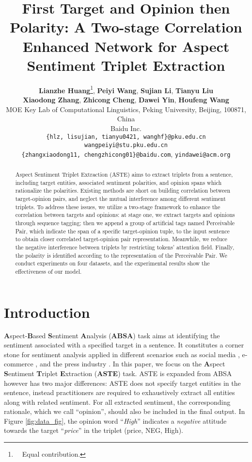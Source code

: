 \documentclass[11pt]{article}
\title{First Target and Opinion then Polarity: A Two-stage Correlation Enhanced Network for Aspect Sentiment Triplet Extraction}
\author{\textbf{Lianzhe Huang}\thanks{~~Equal contribution.}, \textbf{Peiyi Wang}, \textbf{Sujian Li}, \textbf{Tianyu Liu} \\ \textbf{Xiaodong Zhang}, \textbf{Zhicong Cheng}, \textbf{Dawei Yin}, \textbf{Houfeng Wang}\\ 
MOE Key Lab of Computational Linguistics, Peking University, Beijing, 100871, China \\
Baidu Inc.\\
\texttt{\{hlz, lisujian, tianyu0421, wanghf\}@pku.edu.cn} \\ \texttt{wangpeiyi@stu.pku.edu.cn} \\
\texttt{\{zhangxiaodong11, chengzhicong01\}@baidu.com},  
\texttt{yindawei@acm.org}
}
\begin{document}
\maketitle

\begin{abstract}
Aspect Sentiment Triplet Extraction (ASTE) aims to extract triplets from a sentence, including target entities, associated sentiment polarities, and opinion spans which rationalize the polarities.
Existing methods are short on building correlation between target-opinion pairs, and neglect the mutual interference among different sentiment triplets.
To address these issues, we utilize a two-stage framework to enhance the correlation between targets and opinions: at stage one, we extract targets and opinions through sequence tagging; then we append a group of artificial tags named Perceivable Pair, which indicate the span of a specific target-opinion tuple, to the input sentence to obtain closer correlated target-opinion pair representation. Meanwhile, we reduce the negative interference between triplets by restricting tokens' attention field. Finally, the polarity is identified according to the representation of the Perceivable Pair. 
We conduct experiments on four datasets, and the experimental results show the effectiveness of our model. 
\end{abstract} \section{Introduction}\label{chap: intro}

\textbf{A}spect-\textbf{B}ased \textbf{S}entiment \textbf{A}nalysis (\textbf{ABSA}) \cite{liu2012sentiment,ma2017interactive,zhao2019modeling} task aims at identifying the sentiment 
associated with a specified target in a sentence.
It constitutes a corner stone for sentiment analysis \cite{feldman2013techniques,zhang2018deep} applied in different scenarios such as social media \cite{agarwal2011sentiment}, e-commerce \cite{fang2015sentiment}, and the press industry \cite{godbole2007large}. 
In this paper, we focus on the \textbf{A}spect \textbf{S}entiment \textbf{T}riplet \textbf{E}xtraction (\textbf{ASTE}) task. ASTE is expanded from ABSA however has two major differences:  ASTE does not specify target entities in the sentence, instead practitioners are required to exhaustively extract all entities along with related sentiment.  For all extracted sentiment, the corresponding rationale, which we call ``opinion'', should also be included in the final output. In Figure \ref{fig:data_fig}, the opinion word ``\textit{High}'' indicates a \textit{negative} attitude towards the target ``\textit{price}'' in the triplet {(price, NEG, High)}.
\end{document}
